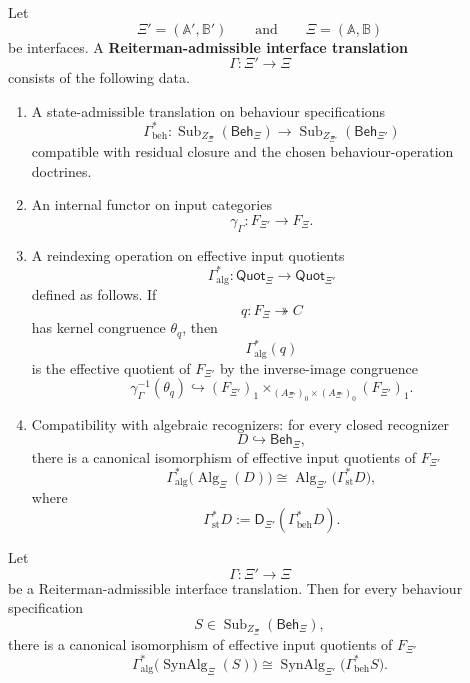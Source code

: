 \begin{definition}
\label{def:reiterman-admissible-interface-translation}
Let
\[
\Xi'=(\mathbb A',\mathbb B')
\qquad\text{and}\qquad
\Xi=(\mathbb A,\mathbb B)
\]
be interfaces. A \textbf{Reiterman-admissible interface translation}
\[
\Gamma:\Xi'\to\Xi
\]
consists of the following data.

\begin{enumerate}
\item A state-admissible translation on behaviour specifications
\[
\Gamma_{\mathrm{beh}}^\ast:
\operatorname{Sub}_{Z_\Xi}(\mathsf{Beh}_\Xi)
\to
\operatorname{Sub}_{Z_{\Xi'}}(\mathsf{Beh}_{\Xi'})
\]
compatible with residual closure and the chosen behaviour-operation
doctrines.

\item An internal functor on input categories
\[
\gamma_\Gamma:F_{\Xi'}\to F_\Xi.
\]

\item A reindexing operation on effective input quotients
\[
\Gamma_{\mathrm{alg}}^\ast:
\mathsf{Quot}_{\Xi}
\to
\mathsf{Quot}_{\Xi'}
\]
defined as follows. If
\[
q:F_\Xi\twoheadrightarrow C
\]
has kernel congruence \(\theta_q\), then
\[
\Gamma_{\mathrm{alg}}^\ast(q)
\]
is the effective quotient of \(F_{\Xi'}\) by the inverse-image congruence
\[
\gamma_\Gamma^{-1}(\theta_q)
\hookrightarrow
(F_{\Xi'})_1
\times_{(A_{\Xi'})_0\times(A_{\Xi'})_0}
(F_{\Xi'})_1.
\]

\item Compatibility with algebraic recognizers: for every closed recognizer
\[
D\hookrightarrow\mathsf{Beh}_{\Xi},
\]
there is a canonical isomorphism of effective input quotients of \(F_{\Xi'}\)
\[
\Gamma_{\mathrm{alg}}^\ast
\bigl(
\operatorname{Alg}_{\Xi}(D)
\bigr)
\cong
\operatorname{Alg}_{\Xi'}
\bigl(
\Gamma_{\mathrm{st}}^\ast D
\bigr),
\]
where
\[
\Gamma_{\mathrm{st}}^\ast D
:=
\mathsf D_{\Xi'}(\Gamma_{\mathrm{beh}}^\ast D).
\]
\end{enumerate}
\end{definition}

\begin{proposition}
\label{prop:reiterman-synalg-commutes-with-translations}
Let
\[
\Gamma:\Xi'\to\Xi
\]
be a Reiterman-admissible interface translation. Then for every behaviour
specification
\[
S\in\operatorname{Sub}_{Z_\Xi}(\mathsf{Beh}_\Xi),
\]
there is a canonical isomorphism of effective input quotients of \(F_{\Xi'}\)
\[
\Gamma_{\mathrm{alg}}^\ast
\bigl(
\operatorname{SynAlg}_{\Xi}(S)
\bigr)
\cong
\operatorname{SynAlg}_{\Xi'}
\bigl(
\Gamma_{\mathrm{beh}}^\ast S
\bigr).
\]
\end{proposition}

